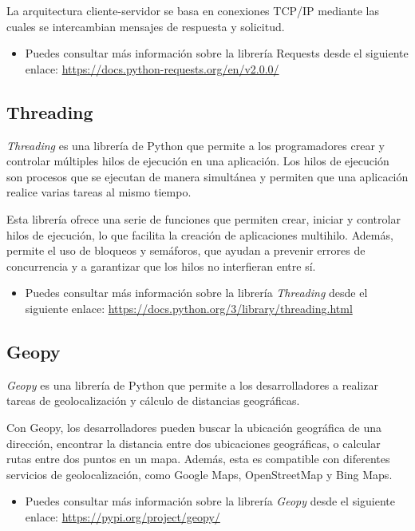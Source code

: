 La arquitectura cliente-servidor se basa en conexiones TCP/IP mediante las cuales se intercambian mensajes de respuesta y solicitud.
 
\begin{itemize}
    \item Puedes consultar más información sobre la librería Requests desde el siguiente enlace: \url{https://docs.python-requests.org/en/v2.0.0/}
\end{itemize}

\subsection{Threading}

\textit{Threading} es una librería de Python que permite a los programadores crear y controlar múltiples hilos de ejecución en una aplicación. Los hilos de ejecución son procesos que se ejecutan de manera simultánea y permiten que una aplicación realice varias tareas al mismo tiempo.

Esta librería ofrece una serie de funciones que permiten crear, iniciar y controlar hilos de ejecución, lo que facilita la creación de aplicaciones multihilo. Además, permite el uso de bloqueos y semáforos, que ayudan a prevenir errores de concurrencia y a garantizar que los hilos no interfieran entre sí.

\begin{itemize}
    \item Puedes consultar más información sobre la librería \textit{Threading} desde el siguiente enlace: \url{https://docs.python.org/3/library/threading.html}
\end{itemize}

\subsection{Geopy}

\textit{Geopy} es una librería de Python que permite a los desarrolladores a realizar tareas de geolocalización y cálculo de distancias geográficas. 

Con Geopy, los desarrolladores pueden buscar la ubicación geográfica de una dirección, encontrar la distancia entre dos ubicaciones geográficas, o calcular rutas entre dos puntos en un mapa. Además, esta es compatible con diferentes servicios de geolocalización, como Google Maps, OpenStreetMap y Bing Maps.

\begin{itemize}
    \item Puedes consultar más información sobre la librería \textit{Geopy} desde el siguiente enlace: \url{https://pypi.org/project/geopy/}
\end{itemize}

